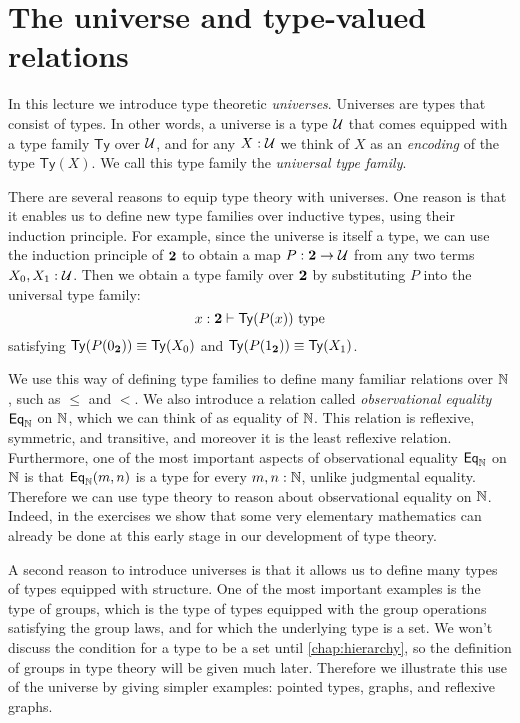 \section{The universe and type-valued relations}

In this lecture we introduce type theoretic \emph{universes}. Universes are types that consist of types. In other words, a universe is a type $\mathcal{U}$ that comes equipped with a type family $\mathsf{Ty}$ over $\mathcal{U}$, and for any $X:\mathcal{U}$ we think of $X$ as an \emph{encoding} of the type $\mathsf{Ty}(X)$. We call this type family the \emph{universal type family}.

There are several reasons to equip type theory with universes. One reason is that it enables us to define new type families over inductive types, using their induction principle. For example, since the universe is itself a type, we can use the induction principle of $\mathbf{2}$ to obtain a map $P:\mathbf{2}\to\mathcal{U}$ from any two terms $X_0,X_1:\mathcal{U}$. Then we obtain a type family over $\mathbf{2}$ by substituting $P$ into the universal type family:
\begin{equation*}
  x:\mathbf{2}\vdash \mathsf{Ty}(P(x))~\mathrm{type}
\end{equation*}
satisfying $\mathsf{Ty}(P(0_\mathbf{2}))\equiv \mathsf{Ty}(X_0)$ and $\mathsf{Ty}(P(1_\mathbf{2}))\equiv \mathsf{Ty}(X_1)$.

We use this way of defining type families to define many familiar relations over ${\mathbb{N}}$, such as $\leq$ and $<$. We also introduce a relation called \emph{observational equality} $\mathsf{Eq}_{\mathbb{N}}$ on ${\mathbb{N}}$, which we can think of as equality of ${\mathbb{N}}$. This relation is reflexive, symmetric, and transitive, and moreover it is the least reflexive relation. Furthermore, one of the most important aspects of observational equality $\mathsf{Eq}_{\mathbb{N}}$ on ${\mathbb{N}}$ is that $\mathsf{Eq}_{\mathbb{N}}(m,n)$ is a type for every $m,n:{\mathbb{N}}$, unlike judgmental equality. Therefore we can use type theory to reason about observational equality on ${\mathbb{N}}$. Indeed, in the exercises we show that some very elementary mathematics can already be done at this early stage in our development of type theory.

A second reason to introduce universes is that it allows us to define many types of types equipped with structure. One of the most important examples is the type of groups, which is the type of types equipped with the group operations satisfying the group laws, and for which the underlying type is a set. We won't discuss the condition for a type to be a set until \cref{chap:hierarchy}, so the definition of groups in type theory will be given much later. Therefore we illustrate this use of the universe by giving simpler examples: pointed types, graphs, and reflexive graphs.


